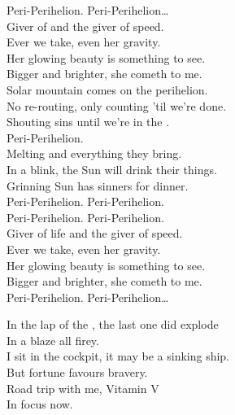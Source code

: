 Peri-Perihelion. Peri-Perihelion… \\

Giver of  and the giver of speed. \\
Ever we take, even her gravity. \\
Her glowing beauty is something to see. \\
Bigger and brighter, she cometh to me. \\

Solar mountain comes on the perihelion. \\
No re-routing, only counting 'til we're done. \\
Shouting sins until we're in the . \\
Peri-Perihelion. \\

Melting  and everything they bring. \\
In a blink, the Sun will drink their things. \\
Grinning Sun has sinners for dinner. \\

Peri-Perihelion. Peri-Perihelion. \\
Peri-Perihelion. Peri-Perihelion. \\

Giver of life and the giver of speed. \\
Ever we take, even her gravity. \\
Her glowing beauty is something to see. \\
Bigger and brighter, she cometh to me. \\

Peri-Perihelion. Peri-Perihelion… \\





In the lap of the , the last one did explode \\
In a blaze all firey. \\
I sit in the cockpit, it may be a sinking ship. \\
But fortune favours bravery. \\

Road trip with me, Vitamin V \\
In focus now. \\

